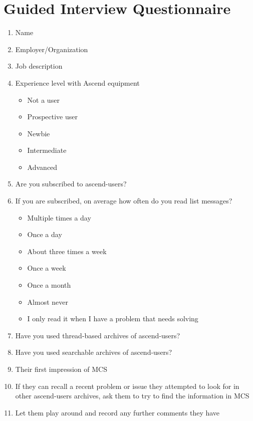 \chapter{Guided Interview Questionnaire}
\label{cha:interview-appendix}
\begin{enumerate}
\item Name
\item Employer/Organization
\item Job description
\item Experience level with Ascend equipment
  \begin{itemize}
  \item Not a user
  \item Prospective user
  \item Newbie
  \item Intermediate
  \item Advanced
  \end{itemize}
\item Are you subscribed to ascend-users?
\item If you are subscribed, on average how often do you read list messages?
  \begin{itemize}
  \item Multiple times a day
  \item Once a day
  \item About three times a week
  \item Once a week
  \item Once a month
  \item Almost never
  \item I only read it when I have a problem that needs solving
  \end{itemize}
\item Have you used thread-based archives of ascend-users?
\item Have you used searchable archives of ascend-users?
\item Their first impression of MCS
\item If they can recall a recent problem or issue they attempted to look for
  in other ascend-users archives, ask them to try to find the information in
  MCS
\item Let them play around and record any further comments they have
\end{enumerate}


